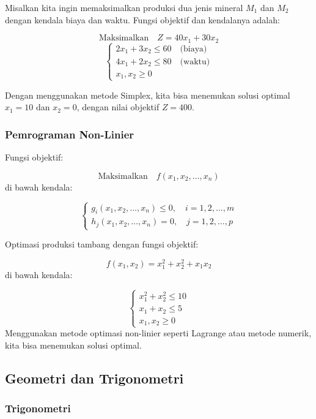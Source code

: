 \documentclass[
]{book}
\begin{document}
Misalkan kita ingin memaksimalkan produksi dua jenis mineral \(M_1\) dan \(M_2\) dengan kendala biaya dan waktu. Fungsi objektif dan kendalanya adalah:

\[
\text{Maksimalkan} \quad Z = 40x_1 + 30x_2
\]
\[
\begin{cases}
2x_1 + 3x_2 \le 60 \quad \text{(biaya)} \\
4x_1 + 2x_2 \le 80 \quad \text{(waktu)} \\
x_1, x_2 \ge 0
\end{cases}
\]

Dengan menggunakan metode Simplex, kita bisa menemukan solusi optimal \(x_1 = 10\) dan \(x_2 = 0\), dengan nilai objektif \(Z = 400\).

\subsubsection*{Pemrograman Non-Linier}\label{pemrograman-non-linier}

Fungsi objektif:

\[
\text{Maksimalkan} \quad f(x_1, x_2, \ldots, x_n)
\]
di bawah kendala:

\[
\begin{cases}
g_i(x_1, x_2, \ldots, x_n) \le 0, \quad i = 1, 2, \ldots, m \\
h_j(x_1, x_2, \ldots, x_n) = 0, \quad j = 1, 2, \ldots, p
\end{cases}
\]

Optimasi produksi tambang dengan fungsi objektif:

\[
f(x_1, x_2) = x_1^2 + x_2^2 + x_1x_2
\]
di bawah kendala:

\[
\begin{cases}
x_1^2 + x_2^2 \le 10 \\
x_1 + x_2 \le 5 \\
x_1, x_2 \ge 0
\end{cases}
\]
Menggunakan metode optimasi non-linier seperti Lagrange atau metode numerik, kita bisa menemukan solusi optimal.

\subsection{Geometri dan Trigonometri}\label{geometri-dan-trigonometri-1}

\subsubsection*{Trigonometri}\label{trigonometri}
\end{document}
